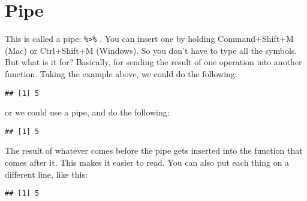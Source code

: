 \documentclass[
]{article}
\newenvironment{Shaded}{\begin{snugshade}}{\end{snugshade}}
\newcommand{\FunctionTok}[1]{\textcolor[rgb]{0.13,0.29,0.53}{\textbf{#1}}}
\newcommand{\NormalTok}[1]{#1}
\newcommand{\SpecialCharTok}[1]{\textcolor[rgb]{0.81,0.36,0.00}{\textbf{#1}}}
\begin{document}
\hypertarget{pipe}{%
\section{Pipe}\label{pipe}}

This is called a pipe: \texttt{\%\textgreater{}\%} . You can insert one
by holding Command+Shift+M (Mac) or Ctrl+Shift+M (Windows). So you don't
have to type all the symbols. But what is it for? Basically, for sending
the result of one operation into another function. Taking the example
above, we could do the following:

\begin{Shaded}
\end{Shaded}

\begin{verbatim}
## [1] 5
\end{verbatim}

or we could use a pipe, and do the following:

\begin{Shaded}
\end{Shaded}

\begin{verbatim}
## [1] 5
\end{verbatim}

The result of whatever comes before the pipe gets inserted into the
function that comes after it. This makes it easier to read. You can also
put each thing on a different line, like this:

\begin{Shaded}
\end{Shaded}

\begin{verbatim}
## [1] 5
\end{verbatim}
\end{document}
